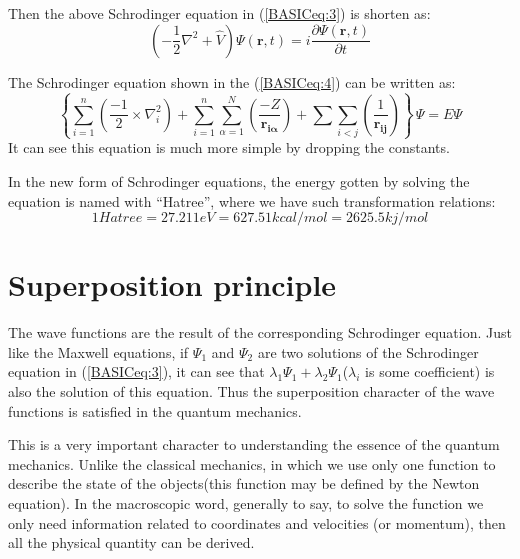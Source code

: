 Then the above Schrodinger equation in (\ref{BASICeq:3}) is shorten
as:
\begin{equation}\label{BASICeq:8}
  \left( -\frac{1}{2}\nabla^{2} + \hat{V}\right)\Psi(\bm{r},t)
= i  \frac{\partial \Psi(\bm{r},t)}{\partial t}
\end{equation}

The Schrodinger equation shown in the (\ref{BASICeq:4}) can be written
as:
\begin{equation}
  \label{BASICeq:9}
  \left\{\sum_{i=1}^{n}(\frac{-1}{2}\times\nabla_{i}^2)+
\sum_{i=1}^{n}\sum_{\alpha=1}^{N}(\frac{-Z}{\bm{r_{i\alpha}}})+
\sum\sum_{i<j}(\frac{1}{\bm{r_{ij}}})
\right\}\,\Psi=E\Psi
\end{equation}
It can see this equation is much more simple by dropping the
constants.

In the new form of Schrodinger equations, the energy gotten by solving
the equation is named with ``Hatree'', where we have such
transformation relations:
\begin{equation}
  \label{BASICeq:10}
  1Hatree = 27.211 eV = 627.51 kcal/mol = 2625.5 kj/mol
\end{equation}


\section{ Superposition principle}
\label{SP_in_basic}
%
%

The wave functions are the result of the corresponding Schrodinger
equation. Just like the Maxwell equations, if $\Psi_{1}$ and
$\Psi_{2}$ are two solutions of the Schrodinger equation in
(\ref{BASICeq:3}), it can see that
$\lambda_{1}\Psi_{1}+\lambda_{2}\Psi_{1}$($\lambda_{i}$ is some
coefficient) is also the solution of this equation. Thus the
superposition character of the wave functions is satisfied in the
quantum mechanics.

This is a very important character to understanding the essence of the
quantum mechanics. Unlike the classical mechanics, in which we use
only one function to describe the state of the objects(this function
may be defined by the Newton equation). In the macroscopic word,
generally to say, to solve the function we only need information
related to coordinates and velocities (or momentum), then all the
physical quantity can be derived.

